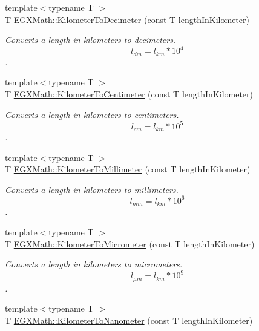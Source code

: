 \begin{DoxyCompactItemize}
{\footnotesize template$<$typename T $>$ }\\T \mbox{\hyperlink{group___e_g_x_math-_conversions-_length_conversions-_s_i-_kilometer-_s_i_ga6b9e471fb53794741dcf3859d316b1c1}{E\+G\+X\+Math\+::\+Kilometer\+To\+Decimeter}} (const T length\+In\+Kilometer)
\begin{DoxyCompactList}\small\item\em Converts a length in kilometers to decimeters. \[ l_{dm}=l_{km} * 10^{4} \]. \end{DoxyCompactList}\item 
{\footnotesize template$<$typename T $>$ }\\T \mbox{\hyperlink{group___e_g_x_math-_conversions-_length_conversions-_s_i-_kilometer-_s_i_ga1d5cac5eab11ffbf7b839180813343d0}{E\+G\+X\+Math\+::\+Kilometer\+To\+Centimeter}} (const T length\+In\+Kilometer)
\begin{DoxyCompactList}\small\item\em Converts a length in kilometers to centimeters. \[ l_{cm}=l_{km} * 10^{5} \]. \end{DoxyCompactList}\item 
{\footnotesize template$<$typename T $>$ }\\T \mbox{\hyperlink{group___e_g_x_math-_conversions-_length_conversions-_s_i-_kilometer-_s_i_ga109bb9ca348173d3bfd643a4e3bd3686}{E\+G\+X\+Math\+::\+Kilometer\+To\+Millimeter}} (const T length\+In\+Kilometer)
\begin{DoxyCompactList}\small\item\em Converts a length in kilometers to millimeters. \[ l_{mm}=l_{km} * 10^{6} \]. \end{DoxyCompactList}\item 
{\footnotesize template$<$typename T $>$ }\\T \mbox{\hyperlink{group___e_g_x_math-_conversions-_length_conversions-_s_i-_kilometer-_s_i_ga345d16c72fcb96ff1dc3b7f290b94c94}{E\+G\+X\+Math\+::\+Kilometer\+To\+Micrometer}} (const T length\+In\+Kilometer)
\begin{DoxyCompactList}\small\item\em Converts a length in kilometers to micrometers. \[ l_{\mu m}=l_{km} * 10^{9} \]. \end{DoxyCompactList}\item 
{\footnotesize template$<$typename T $>$ }\\T \mbox{\hyperlink{group___e_g_x_math-_conversions-_length_conversions-_s_i-_kilometer-_s_i_gaa2272319841906222fd95dc1c3e90549}{E\+G\+X\+Math\+::\+Kilometer\+To\+Nanometer}} (const T length\+In\+Kilometer)

\end{DoxyCompactItemize}
